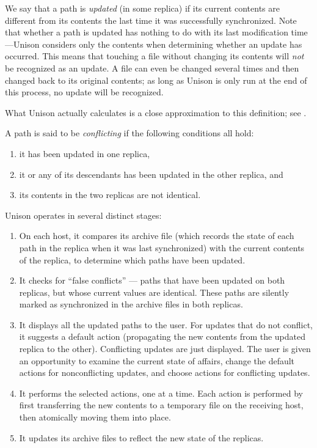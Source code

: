 \documentclass{article}
\begin{document}
We say that a path is {\em updated} (in some replica) if its current
contents are different from its contents the last time it was successfully
synchronized.  Note that whether a path is updated has nothing to do with
its last modification time---Unison considers only the contents when
determining whether an update has occurred.  This means that touching a file
without changing its contents will {\em not} be recognized as an update.  A
file can even be changed several times and then changed back to its original
contents; as long as Unison is only run at the end of this process, no
update will be recognized.

What Unison actually calculates is a close approximation to this
definition; see .


A path is said to be {\em conflicting} if the following conditions all hold:
\begin{enumerate}
\item it has been updated in one replica, 
\item it or any of its descendants has been updated in the other
  replica, 
and
\item its contents in the two replicas are not identical.
\end{enumerate}




Unison operates in several distinct stages:
\begin{enumerate}
\item On each host, it compares its archive file (which records
the state of each path in the replica when it was last synchronized)
with the current contents of the replica, to determine which paths
have been updated.
\item It checks for ``false conflicts'' --- paths that have been
updated on both replicas, but whose current values are identical.
These paths are silently marked as synchronized in the archive files
in both replicas.
\item It displays all the updated paths to the user.  For updates that
do not conflict, it suggests a default action (propagating the new
contents from the updated replica to the other).  Conflicting updates
are just displayed.  The user is given an opportunity to examine the
current state of affairs, change the default actions for
nonconflicting updates, and choose actions for conflicting updates.
\item It performs the selected actions, one at a time.  Each action is
performed by first transferring the new contents to a temporary file
on the receiving host, then atomically moving them into place.
\item It updates its archive files to reflect the new state of the
replicas. 
\end{enumerate}
\end{document}
